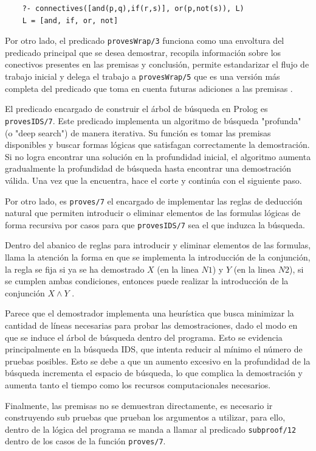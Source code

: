 \documentclass[11pt, letterpaper]{article}
\begin{document}
	\begin{verbatim}
	?- connectives([and(p,q),if(r,s)], or(p,not(s)), L)
	L = [and, if, or, not]
	\end{verbatim}
	
	
	Por otro lado, el predicado \texttt{provesWrap/3} funciona como una envoltura del predicado principal que se desea demostrar, recopila información sobre los conectivos presentes en las premisas y conclusión, permite estandarizar el flujo de trabajo inicial y delega el trabajo a \texttt{provesWrap/5} que es una versión más completa del predicado que toma en cuenta futuras adiciones a las premisas .
	
	El predicado encargado de construir el árbol de búsqueda en Prolog es \texttt{provesIDS/7}. Este predicado implementa un algoritmo de búsqueda "profunda" (o "deep search") de manera iterativa. Su función es tomar las premisas disponibles y buscar formas lógicas que satisfagan correctamente la demostración. Si no logra encontrar una solución en la profundidad inicial, el algoritmo aumenta gradualmente la profundidad de búsqueda hasta encontrar una demostración válida. Una vez que la encuentra, hace el corte y continúa con el siguiente paso.
	
	Por otro lado, es \texttt{proves/7} el encargado de implementar las reglas de deducción natural que permiten introducir o eliminar elementos de las formulas lógicas de forma recursiva por casos para que \texttt{provesIDS/7} sea el que induzca la búsqueda.
	
	Dentro del abanico de reglas para introducir y eliminar elementos de las formulas, llama la atención la forma en que se implementa la introducción de la conjunción, la regla se fija si ya se ha demostrado $X$ (en la linea $N1$) y $Y$ (en la linea $N2$), si se cumplen ambas condiciones, entonces puede realizar la introducción de la conjunción $X\land Y$ .

	Parece que el demostrador implementa una heurística que busca minimizar la cantidad de líneas necesarias para probar las demostraciones, dado el modo en que se induce el árbol de búsqueda dentro del programa. Esto se evidencia principalmente en la búsqueda IDS, que intenta reducir al mínimo el número de pruebas posibles. Esto se debe a que un aumento excesivo en la profundidad de la búsqueda incrementa el espacio de búsqueda, lo que complica la demostración y aumenta tanto el tiempo como los recursos computacionales necesarios.
	
	Finalmente, las premisas no se demuestran directamente, es necesario ir construyendo sub pruebas que prueban los argumentos a utilizar, para ello, dentro de la lógica del programa se manda a llamar al predicado \texttt{subproof/12} dentro de los casos de la función \texttt{proves/7}.
	
\end{document}
